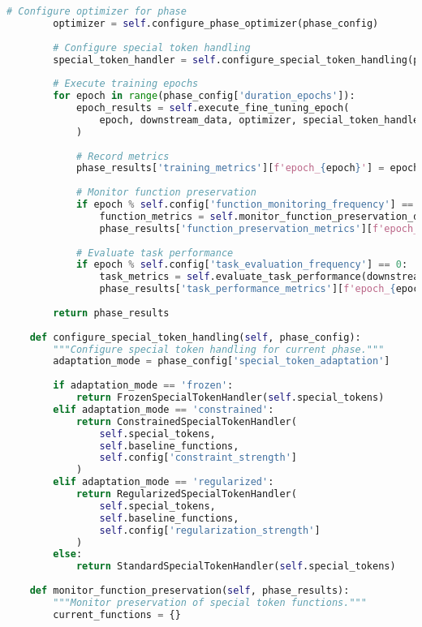 \begin{lstlisting}[language=Python, caption=Function-preserving fine-tuning framework]
        # Configure optimizer for phase
        optimizer = self.configure_phase_optimizer(phase_config)
        
        # Configure special token handling
        special_token_handler = self.configure_special_token_handling(phase_config)
        
        # Execute training epochs
        for epoch in range(phase_config['duration_epochs']):
            epoch_results = self.execute_fine_tuning_epoch(
                epoch, downstream_data, optimizer, special_token_handler, task_config
            )
            
            # Record metrics
            phase_results['training_metrics'][f'epoch_{epoch}'] = epoch_results['training_metrics']
            
            # Monitor function preservation
            if epoch % self.config['function_monitoring_frequency'] == 0:
                function_metrics = self.monitor_function_preservation_during_training()
                phase_results['function_preservation_metrics'][f'epoch_{epoch}'] = function_metrics
            
            # Evaluate task performance
            if epoch % self.config['task_evaluation_frequency'] == 0:
                task_metrics = self.evaluate_task_performance(downstream_data, task_config)
                phase_results['task_performance_metrics'][f'epoch_{epoch}'] = task_metrics
        
        return phase_results
    
    def configure_special_token_handling(self, phase_config):
        """Configure special token handling for current phase."""
        adaptation_mode = phase_config['special_token_adaptation']
        
        if adaptation_mode == 'frozen':
            return FrozenSpecialTokenHandler(self.special_tokens)
        elif adaptation_mode == 'constrained':
            return ConstrainedSpecialTokenHandler(
                self.special_tokens, 
                self.baseline_functions,
                self.config['constraint_strength']
            )
        elif adaptation_mode == 'regularized':
            return RegularizedSpecialTokenHandler(
                self.special_tokens,
                self.baseline_functions,
                self.config['regularization_strength']
            )
        else:
            return StandardSpecialTokenHandler(self.special_tokens)
    
    def monitor_function_preservation(self, phase_results):
        """Monitor preservation of special token functions."""
        current_functions = {}
        

\end{lstlisting}
